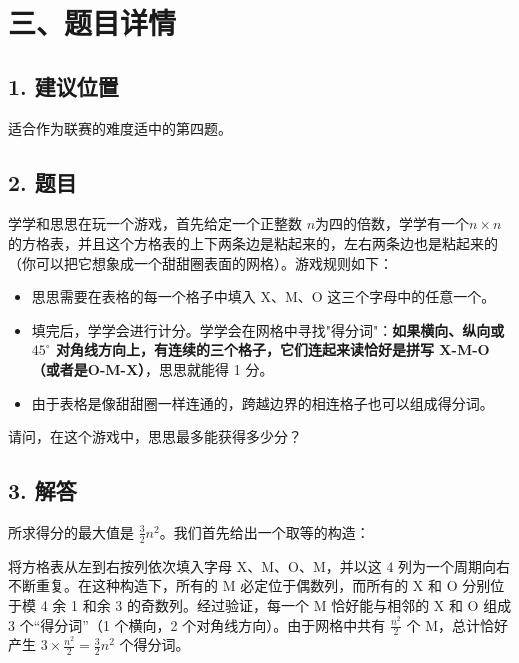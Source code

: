 \documentclass[zihao=5, a4paper]{ctexart}
\begin{document}
\section*{三、题目详情}

\subsection*{1. 建议位置}
适合作为联赛的难度适中的第四题。





\subsection*{2. 题目}

学学和思思在玩一个游戏，首先给定一个正整数 $n$为四的倍数，学学有一个$n \times n$的方格表，并且这个方格表的上下两条边是粘起来的，左右两条边也是粘起来的（你可以把它想象成一个甜甜圈表面的网格）。游戏规则如下：
\begin{itemize}
    \item 思思需要在表格的每一个格子中填入 X、M、O 这三个字母中的任意一个。
    \item 填完后，学学会进行计分。学学会在网格中寻找"得分词"：\textbf{如果横向、纵向或 $45^\circ$ 对角线方向上，有连续的三个格子，它们连起来读恰好是拼写 X-M-O（或者是O-M-X）}，思思就能得 1 分。
    \item 由于表格是像甜甜圈一样连通的，跨越边界的相连格子也可以组成得分词。
\end{itemize}
请问，在这个游戏中，思思最多能获得多少分？



\subsection*{3. 解答}


所求得分的最大值是 $\frac{3}{2}n^2$。我们首先给出一个取等的构造：

将方格表从左到右按列依次填入字母 X、M、O、M，并以这 4 列为一个周期向右不断重复。在这种构造下，所有的 M 必定位于偶数列，而所有的 X 和 O 分别位于模 4 余 1 和余 3 的奇数列。经过验证，每一个 M 恰好能与相邻的 X 和 O 组成 3 个“得分词”（1 个横向，2 个对角线方向）。由于网格中共有 $\frac{n^2}{2}$ 个 M，总计恰好产生 $3 \times \frac{n^2}{2} = \frac{3}{2}n^2$ 个得分词。
\\
\end{document}
